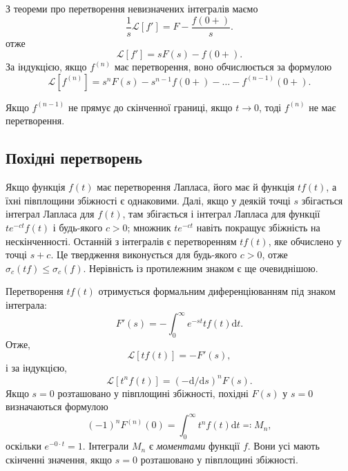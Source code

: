 \documentclass[14pt,twoside]{extreport}
\theoremstyle{mystyle}
\numberwithin{equation}{chapter}
\begin{document}
З теореми про перетворення невизначених інтегралів маємо
\begin{equation*}
	\dfrac{1}{s}\mathcal{L}[f']=F-\dfrac{f(0+)}{s}.
\end{equation*}
отже
\begin{equation*}
	\mathcal{L}[f']=sF(s)-f(0+).
\end{equation*}
За індукцією, якщо $f^{(n)}$ має перетворення, воно обчислюється за формулою
\begin{equation*}
	\mathcal{L}[f^{(n)}]=s^{n}F(s)-s^{n-1}f(0+)-\ldots-f^{(n-1)}(0+).
\end{equation*}

Якщо $f^{(n-1)}$ не прямує до скінченної границі, якщо $t\to 0$, тоді $f^{(n)}$ не має перетворення.


\subsection{Похідні перетворень}

Якщо функція $f(t)$ має перетворення Лапласа, його має й функція $tf(t)$, а їхні півплощини збіжності є однаковими. Далі, якщо у деякій точці $s$ збігається інтеграл Лапласа для $f(t)$, там збігається і інтеграл Лапласа для функції $te^{-ct}f(t)$ і будь-якого $c>0$; множник $te^{-ct}$ навіть покращує збіжність на нескінченності. Останній з інтегралів є перетворенням $tf(t)$, яке обчислено у точці $s+c$. Це твердження виконується для будь-якого $c>0$, отже $\sigma_{c}(tf)\leqslant\sigma_{c}(f)$. Нерівність із протилежним знаком є ще очевиднішою.

Перетворення $tf(t)$ отримується формальним диференціюванням під знаком інтеграла:
\begin{equation*}
	\displaystyle F'(s)=-\int_{0}^{\infty}e^{-st}tf(t)\mathrm{d}t.
\end{equation*}
Отже,
\begin{equation*}
	\mathcal{L}[tf(t)]=-F'(s),
\end{equation*}
і за індукцією,
\begin{equation*}
	\mathcal{L}[t^{n}f(t)]=(-\mathrm{d}/\mathrm{d}s)^{n}F(s).
\end{equation*}
Якщо $s=0$ розташовано у півплощині збіжності, похідні $F(s)$ у $s=0$ визначаються формулою
\begin{equation*}
	(-1)^{n}\displaystyle F^{(n)}(0)=\int_{0}^{\infty}t^{n}f(t)\mathrm{d}t\eqqcolon M_{n},
\end{equation*}
оскільки $e^{-0\cdot t}=1$. Інтеграли $M_{n}$ є \emph{моментами} функції $f$. Вони усі мають скінченні значення, якщо $s=0$ розташовано у півплощині збіжності.
\end{document}
